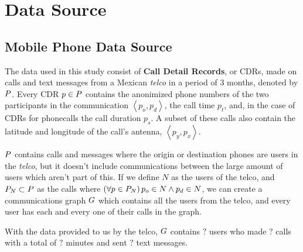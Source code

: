 \section{Data Source}

\subsection{Mobile Phone Data Source}

The data used in this study consist of \textbf{Call Detail Records}, or CDRs, made on calls and text messages from a Mexican \textit{telco} in a period of 3 months, denoted by \( \mathlarger{P} \). Every CDR \( p \in \mathlarger{P} \)  contains the anonimized phone numbers of the two participants in the communication \( \left< p_o, p_d \right> \), the call time \( p_t \), and, in the case of CDRs for phonecalls the call duration \( p_s \). A subset of these calls also contain the latitude and longitude of the call's antenna, \( \left< p_y, p_x \right> \).

\( \mathlarger{P} \) contains calls and messages where the origin or destination phones are users in the \textit{telco}, but it doesn't include communications between the large amount of users which aren't part of this. If we define \( N \) as the users of the telco, and \( \mathlarger{P}_N \subset \mathlarger{P} \) as the calls where \( \left( \forall p \in \mathlarger{P}_N \right) p_o \in N \wedge p_d \in N \), we can create a communications graph \( \mathlarger{G} \) which contains all the users from the telco, and every user has each and every one of their calls in the graph.

With the data provided to us by the telco, \( \mathlarger{G} \) contains \( ? \) users who made \( ? \) calls with a total of \( ? \) minutes and sent \( ? \) text messages.
